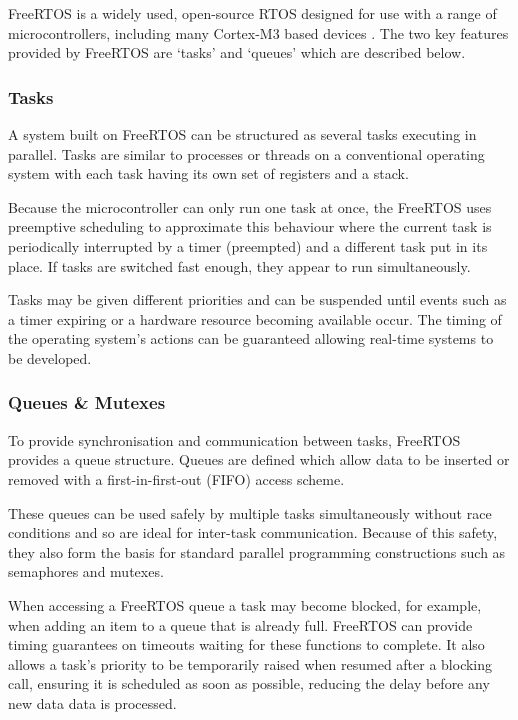 			FreeRTOS is a widely used, open-source RTOS designed for use with a range
			of microcontrollers, including many Cortex-M3 based devices
			\cite{freertos}. The two key features provided by FreeRTOS are `tasks' and
			`queues' which are described below.
			
			\subsubsection{Tasks}
				
				A system built on FreeRTOS can be structured as several tasks
				executing in parallel. Tasks are similar to processes or threads on a
				conventional operating system with each task having its own set of
				registers and a stack.
				
				Because the microcontroller can only run one task at once, the FreeRTOS
				uses preemptive scheduling to approximate this behaviour where the
				current task is periodically interrupted by a timer (preempted) and a
				different task put in its place. If tasks are switched fast enough, they
				appear to run simultaneously.
				
				Tasks may be given different priorities and can be suspended until
				events such as a timer expiring or a hardware resource becoming
				available occur. The timing of the operating system's actions can be
				guaranteed allowing real-time systems to be developed.
				
			\subsubsection{Queues \& Mutexes}
				
				To provide synchronisation and communication between tasks, FreeRTOS
				provides a queue structure. Queues are defined which allow data to be
				inserted or removed with a first-in-first-out (FIFO) access scheme.
				
				These queues can be used safely by multiple tasks simultaneously without
				race conditions and so are ideal for inter-task communication.  Because
				of this safety, they also form the basis for standard parallel
				programming constructions such as semaphores and mutexes.
				
				When accessing a FreeRTOS queue a task may become blocked, for example,
				when adding an item to a queue that is already full. FreeRTOS can
				provide timing guarantees on timeouts waiting for these functions to
				complete. It also allows a task's priority to be temporarily raised when
				resumed after a blocking call, ensuring it is scheduled as soon as
				possible, reducing the delay before any new data data is processed.
